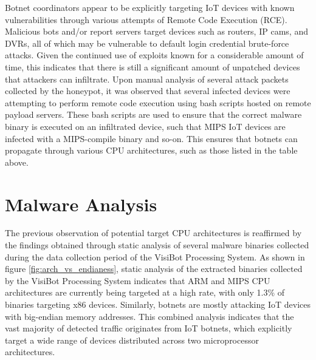 Botnet coordinators appear to be explicitly targeting IoT devices with known vulnerabilities through various attempts of Remote Code Execution (RCE). Malicious bots and/or report servers target devices such as routers, IP cams, and DVRs, all of which may be vulnerable to default login credential brute-force attacks. Given the continued use of exploits known for a considerable amount of time, this indicates that there is still a significant amount of unpatched devices that attackers can infiltrate. Upon manual analysis of several attack packets collected by the honeypot, it was observed that several infected devices were attempting to perform remote code execution using bash scripts hosted on remote payload servers. These bash scripts are used to ensure that the correct malware binary is executed on an infiltrated device, such that MIPS IoT devices are infected with a MIPS-compile binary and so-on. This ensures that botnets can propagate through various CPU architectures, such as those listed in the table above.

































\section{Malware Analysis}

The previous observation of potential target CPU architectures is reaffirmed by the findings obtained through static analysis of several malware binaries collected during the data collection period of the VisiBot Processing System. As shown in figure \ref{fig:arch_vs_endianess}, static analysis of the extracted binaries collected by the VisiBot Processing System indicates that ARM and MIPS CPU architectures are currently being targeted at a high rate, with only 1.3\% of binaries targeting x86 devices. Similarly, botnets are mostly attacking IoT devices with big-endian memory addresses. This combined analysis indicates that the vast majority of detected traffic originates from IoT botnets, which explicitly target a wide range of devices distributed across two microprocessor architectures.

